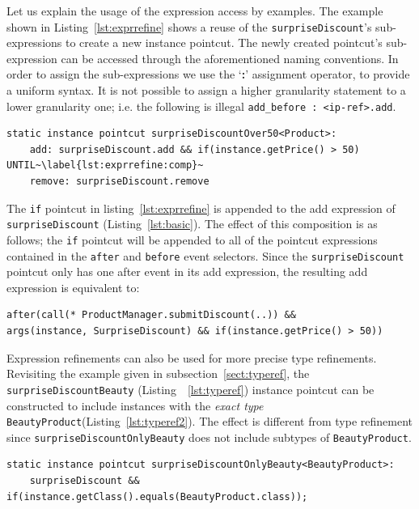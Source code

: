 \documentclass{acm_proc_article-sp}
\newcommand{\lstinln}[1]{\lstinline~#1~}
\begin{document}
Let us explain the usage of the expression access by examples. The example shown in Listing~\ref{lst:exprrefine} shows a reuse of the \lstinln{surpriseDiscount}'s sub-expressions to create a new instance pointcut. The newly created pointcut's sub-expression can be accessed through the aforementioned naming conventions. In order to assign the sub-expressions we use the `\textbf{\textsf{:}}' assignment operator, to provide a uniform syntax.  It is not possible to assign a higher granularity statement to a lower granularity one; i.e. the following is illegal \lstinln{add_before : <ip-ref>.add}.

\begin{lstlisting}[float=h!, caption={Expression refinement of \lstinln{surpriseDiscount}(Listing~\ref{lst:basic}) instance pointcut}, label={lst:exprrefine}]
static instance pointcut surpriseDiscountOver50<Product>: 
	add: surpriseDiscount.add && if(instance.getPrice() > 50) UNTIL~\label{lst:exprrefine:comp}~
    remove: surpriseDiscount.remove
\end{lstlisting}


The \lstinln{if} pointcut in listing~\ref{lst:exprrefine} is appended to the add expression of \lstinln{surpriseDiscount} (Listing~\ref{lst:basic}). The effect of this composition is  as follows; the \lstinln{if} pointcut will be appended to all of the pointcut expressions contained in the \lstinln{after} and \lstinln{before} event selectors. Since the  \lstinln{surpriseDiscount} pointcut only has one after event in its add expression, the resulting add expression is equivalent to: 

\begin{lstlisting}[numbers=none]
after(call(* ProductManager.submitDiscount(..)) && 
args(instance, SurpriseDiscount) && if(instance.getPrice() > 50))
\end{lstlisting}

Expression refinements can also be used for more precise type refinements. Revisiting the example given in subsection~\ref{sect:typeref}, the \lstinln{surpriseDiscountBeauty} (Listing~~\ref{lst:typeref}) instance pointcut can be constructed to include instances with the \emph{exact type} \lstinln{BeautyProduct}(Listing~\ref{lst:typeref2}). The effect is different from type refinement since \lstinln{surpriseDiscountOnlyBeauty} does not include subtypes of \lstinln{BeautyProduct}. 

\begin{lstlisting}[float=h!,caption={Type refinement by expression refinement}, label={lst:typeref2}]
static instance pointcut surpriseDiscountOnlyBeauty<BeautyProduct>: 
	surpriseDiscount && if(instance.getClass().equals(BeautyProduct.class));
\end{lstlisting}
\end{document}
